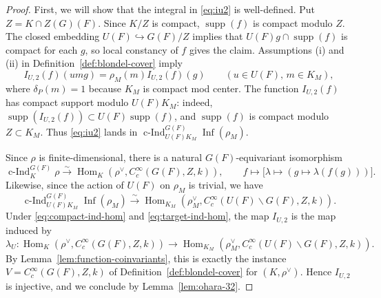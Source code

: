\documentclass[reqno]{amsart}
\numberwithin{equation}{subsection}
\newcommand{\co}{\colon}
\DeclareMathOperator{\Hom}{Hom}
\DeclareMathOperator{\cInd}{c-Ind}
\theoremstyle{remark}
\numberwithin{equation}{subsection}
\numberwithin{figure}{subsection}
\begin{document}
\begin{proof}
First, we will show that the integral in \eqref{eq:iu2} is well-defined. Put $Z=K\cap Z(G)(F)$. Since $K/Z$ is compact, $\operatorname{supp}(f)$ is compact modulo $Z$. The closed embedding $U(F)\hookrightarrow G(F)/Z$ implies that $U(F)g\cap\operatorname{supp}(f)$ is compact for each $g$, so local constancy of $f$ gives the claim. Assumptions (i) and (ii) in Definition~\ref{def:blondel-cover} imply
\[
I_{U,2}(f)(u m g)=\rho_M(m) I_{U,2}(f)(g)
\qquad
(u\in U(F),\,m\in K_M),
\]
where $\delta_P(m)=1$ because $K_M$ is compact mod center. The function $I_{U,2}(f)$ has compact support modulo $U(F)K_M$: indeed, $\operatorname{supp}(I_{U,2}(f))\subset U(F)\operatorname{supp}(f)$, and $\operatorname{supp}(f)$ is compact modulo $Z\subset K_M$. Thus \eqref{eq:iu2} lands in $\cInd_{U(F)K_M}^{G(F)}\operatorname{Inf}(\rho_M)$.

Since $\rho$ is finite-dimensional, there is a natural $G(F)$-equivariant isomorphism
\begin{equation}\label{eq:compact-ind-hom}
\cInd_K^{G(F)}\rho
\xrightarrow{\sim}
\Hom_K(\rho^\vee,C_c^\infty(G(F),Z,k)),
\qquad
f\longmapsto
\bigl[\lambda\mapsto(g\mapsto \lambda(f(g)))\bigr].
\end{equation}
Likewise, since the action of $U(F)$ on $\rho_M$ is trivial, we have 
\begin{equation}\label{eq:target-ind-hom}
\cInd_{U(F)K_M}^{G(F)}\operatorname{Inf}(\rho_M)
\xrightarrow{\sim}
\Hom_{K_M}(\rho_M^\vee,
C_c^\infty(U(F)\backslash G(F),Z,k)).
\end{equation}
Under \eqref{eq:compact-ind-hom} and \eqref{eq:target-ind-hom}, the map \(I_{U,2}\) is the map induced by
\[
\lambda_U\co \Hom_K(\rho^\vee,C_c^\infty(G(F),Z,k))
\longrightarrow
\Hom_{K_M}(\rho_M^\vee,C_c^\infty(U(F)\backslash G(F),Z,k)).
\]
By Lemma~\ref{lem:function-coinvariants}, this is exactly the instance \(V=C_c^\infty(G(F),Z,k)\) of Definition~\ref{def:blondel-cover} for $(K, \rho^\vee)$. Hence $I_{U,2}$ is injective, and we conclude by Lemma~\ref{lem:ohara-32}.
\end{proof}







\end{document}
